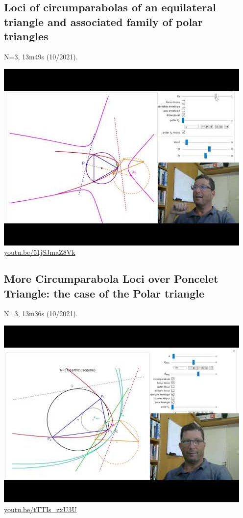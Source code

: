 \documentclass[12pt]{amsart}
\begin{document}
\subsection{Loci of circumparabolas of an equilateral triangle and associated family of polar triangles}
\label{vid:51jSJmaZ8Vk}
\noindent N=3, 13m49s (10/2021). 
\begin{center}\includegraphics[width=.5\textwidth]{pics/51jSJmaZ8Vk.jpg} \\ 
\href{https://youtu.be/51jSJmaZ8Vk}{\url{youtu.be/51jSJmaZ8Vk}}\end{center}
% 

\subsection{More Circumparabola Loci over Poncelet Triangle: the case of the Polar triangle}
\label{vid:tTTIs_zxU3U}
\noindent N=3, 13m36s (10/2021). 
\begin{center}\includegraphics[width=.5\textwidth]{pics/tTTIs_zxU3U.jpg} \\ 
\href{https://youtu.be/tTTIs_zxU3U}{\url{youtu.be/tTTIs\_zxU3U}}\end{center}
% 
\end{document}
